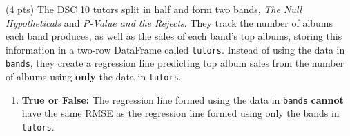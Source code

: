 \documentclass[twoside,12pt]{article}
\begin{document}
\begin{probset}
\begin{prob}[(19 pts)]
\begin{subprobset}
\begin{subprob}
\vspace{0.5em}


\smallskip


\smallskip



\smallskip


\smallskip


\smallskip


\smallskip



\smallskip


\end{subprob}

\newpage

\begin{subprob} (4 pts) 
The DSC 10 tutors split in half and form two bands, \textit{The Null Hypotheticals} and \textit{P-Value and the Rejects}. They track the number of albums each band produces, as well as the sales of each band's top albums, storing this information in a two-row DataFrame called \texttt{tutors}. Instead of using the data in \texttt{bands}, they create a regression line predicting top album sales from the number of albums using \textbf{only} the data in \texttt{tutors}.

\bigskip

\begin{enumerate}
    \item [(i)] \textbf{True or False:} The regression line formed using the data in \texttt{bands} \textbf{cannot} have the same RMSE as the regression line formed using only the bands in \texttt{tutors}.

    \smallskip
        \begin{center}
             \qquad {}
        \end{center}
    

\end{enumerate}
\end{subprob}
\end{subprobset}
\end{prob}
\end{probset}
\end{document}
